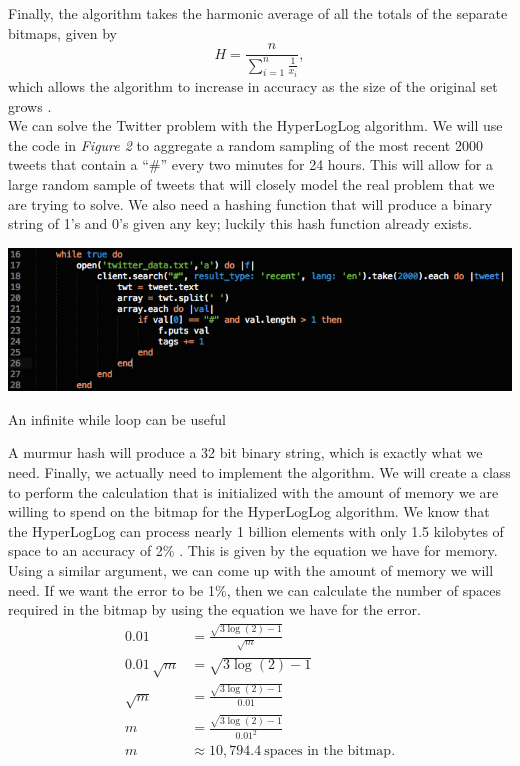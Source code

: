 \documentclass{article}
\begin{document}
Finally, the algorithm takes the harmonic average of all the totals of the separate bitmaps, given by
\[
H = \frac{n}{\sum_{i=1}^{n}\frac{1}{x_{i}}},
\] 
which allows the algorithm to increase in accuracy as the size of the original set grows \cite{Yousra}.\\
\indent We can solve the Twitter problem with the HyperLogLog algorithm.
We will use the code in \textit{Figure 2} to aggregate a random sampling of the most recent 2000 tweets that contain a ``\#'' every two minutes for 24 hours.
This will allow for a large random sample of tweets that will closely model the real problem that we are trying to solve. 
We also need a hashing function that will produce a binary string of 1's and 0's given any key; luckily this hash function already exists. 
\begin{floatingfigure}[hr]{8cm}
\centering
\begin{framed}
\includegraphics[scale=0.3]{twitter_problem/ruby_code_01}
\caption{An infinite while loop can be useful}
\end{framed}
\end{floatingfigure}
A murmur hash will produce a 32 bit binary string, which is exactly what we need.
Finally, we actually need to implement the algorithm. 
We will create a class to perform the calculation that is initialized with the amount of memory we are willing to spend on the bitmap for the HyperLogLog algorithm. 
\noindent We know that the HyperLogLog can process nearly 1 billion elements with only 1.5 kilobytes of space to an accuracy of 2\% \cite{Flaj}.\clearpage
This is given by the equation we have for memory.
Using a similar argument, we can come up with the amount of memory we will need. 
If we want the error to be 1\%, then we can calculate the number of spaces required in the bitmap by using the equation we have for the error.
\begin{align*}
0.01 &= \frac{\sqrt{3\log{(2)} - 1}}{\sqrt{m}}\\
0.01\,\sqrt{m} &= \sqrt{3\log{(2)} - 1}\\
\sqrt{m}\, &= \frac{\sqrt{3\log{(2)} - 1}}{0.01}\\
m &= \frac{\sqrt{3\log{(2)} - 1}}{0.01^{2}}\\
m &\approx 10,794.4\ \text{spaces in the bitmap}.
\end{align*}
\end{document}
